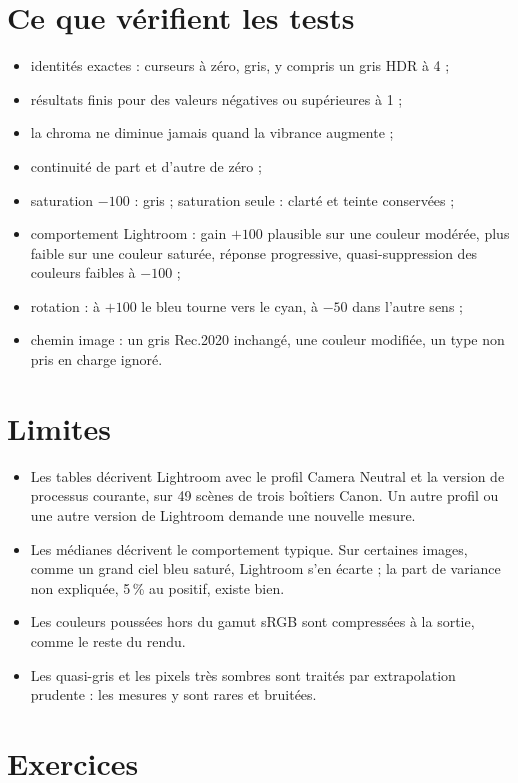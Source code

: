 \section{Ce que vérifient les tests}
\begin{itemize}
\item identités exactes : curseurs à zéro, gris, y compris un gris HDR à 4 ;
\item résultats finis pour des valeurs négatives ou supérieures à 1 ;
\item la chroma ne diminue jamais quand la vibrance augmente ;
\item continuité de part et d'autre de zéro ;
\item saturation $-100$ : gris ; saturation seule : clarté et teinte conservées ;
\item comportement Lightroom : gain $+100$ plausible sur une couleur modérée,
plus faible sur une couleur saturée, réponse progressive, quasi-suppression des
couleurs faibles à $-100$ ;
\item rotation : à $+100$ le bleu tourne vers le cyan, à $-50$ dans l'autre sens ;
\item chemin image : un gris Rec.2020 inchangé, une couleur modifiée, un type
non pris en charge ignoré.
\end{itemize}

\section{Limites}
\begin{itemize}
\item Les tables décrivent Lightroom avec le profil Camera Neutral et la
version de processus courante, sur 49 scènes de trois boîtiers Canon. Un autre
profil ou une autre version de Lightroom demande une nouvelle mesure.
\item Les médianes décrivent le comportement typique. Sur certaines images,
comme un grand ciel bleu saturé, Lightroom s'en écarte ; la part de variance
non expliquée, 5\,\% au positif, existe bien.
\item Les couleurs poussées hors du gamut sRGB sont compressées à la sortie,
comme le reste du rendu.
\item Les quasi-gris et les pixels très sombres sont traités par extrapolation
prudente : les mesures y sont rares et bruitées.
\end{itemize}

\section{Exercices}
